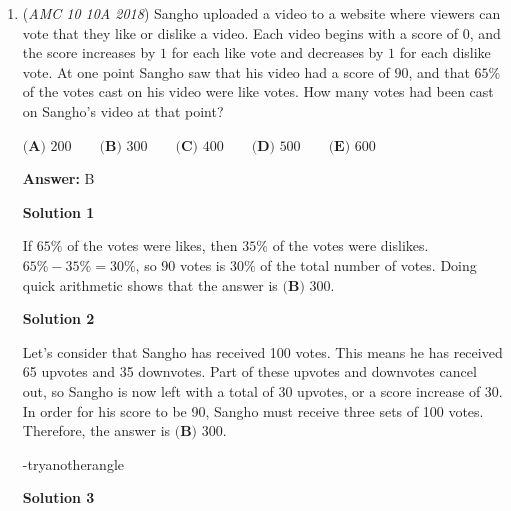 \begin{enumerate}
\textbf{Solution 2}

Think of the distances as if they are on a number line. Alice claims that $d > 6$, Bob says $d < 5$, while Charlie thinks $d < 4$. This means that all possible numbers less than $5$ and greater than $6$ are included. However, since the three statements are actually false, the distance to the nearest town is one of the numbers not covered. Therefore, the answer is $\boxed{\textbf{(D) } (5,6)}$.

 Education, the Study of Everything

 


 


 


	\item (\textit{AMC 10 10A 2018}) Sangho uploaded a video to a website where viewers can vote that they like or dislike a video. Each video begins with a score of $0$, and the score increases by $1$ for each like vote and decreases by $1$ for each dislike vote. At one point Sangho saw that his video had a score of $90$, and that $65\%$ of the votes cast on his video were like votes. How many votes had been cast on Sangho's video at that point?


 $\textbf{(A) }   200   \qquad        \textbf{(B) }   300   \qquad    \textbf{(C) }   400   \qquad   \textbf{(D) }  500  \qquad  \textbf{(E) }   600$

 \textbf{Answer: }B



\textbf{Solution 1}

If $65\%$ of the votes were likes, then $35\%$ of the votes were dislikes. $65\%-35\%=30\%$, so $90$ votes is $30\%$ of the total number of votes. Doing quick arithmetic shows that the answer is $\boxed{\textbf{(B) } 300}$.

 



\textbf{Solution 2}

Let's consider that Sangho has received 100 votes. This means he has received 65 upvotes and 35 downvotes. Part of these upvotes and downvotes cancel out, so Sangho is now left with a total of 30 upvotes, or a score increase of 30. In order for his score to be 90, Sangho must receive three sets of 100 votes. Therefore, the answer is $\boxed{\textbf{(B) } 300}$.

 -tryanotherangle

 



\textbf{Solution 3}


\end{enumerate}
